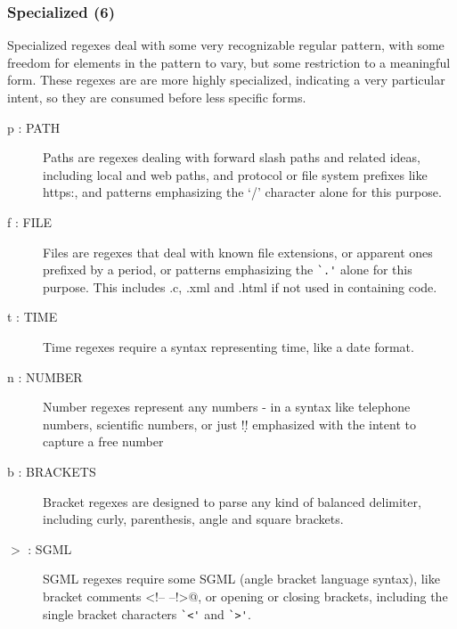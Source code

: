 \subsubsection{Specialized (6)}
Specialized regexes deal with some very recognizable regular pattern, with some freedom for elements in the pattern to vary, but some restriction to a meaningful form.  These regexes are are more highly specialized, indicating a very particular intent, so they are consumed before less specific forms.
\begin{description}
\item[ p : PATH ] Paths are regexes dealing with forward slash paths and related ideas, including local and web paths, and protocol or file system prefixes like https:, and patterns emphasizing the `/' character alone for this purpose.
\item[ f : FILE ] Files are regexes that deal with known file extensions, or apparent ones prefixed by a period, or patterns emphasizing the \verb!`.'!  alone for this purpose.  This includes .c, .xml and .html if not used in containing code.
\item[ t : TIME ] Time regexes require a syntax representing time, like a date format.
\item[ n : NUMBER ] Number regexes represent any numbers - in a syntax like telephone numbers, scientific numbers, or just \bverb!\d! emphasized with the intent to capture a free number
\item[ b : BRACKETS ] Bracket regexes are designed to parse any kind of balanced delimiter, including curly, parenthesis, angle and square brackets.
\item[ $>$ : SGML ] SGML regexes require some SGML (angle bracket language syntax), like bracket comments \verb@<!-- --!>@, or opening or closing brackets, including the single bracket characters \verb!`<'! and \verb!`>'!.
\end{description}

